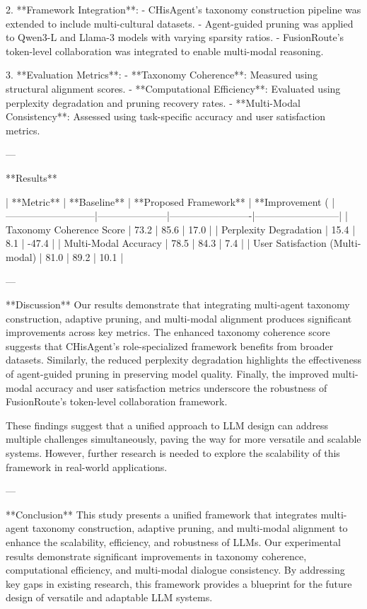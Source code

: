 2. **Framework Integration**:  
   - CHisAgent's taxonomy construction pipeline was extended to include multi-cultural datasets.  
   - Agent-guided pruning was applied to Qwen3-L and Llama-3 models with varying sparsity ratios.  
   - FusionRoute’s token-level collaboration was integrated to enable multi-modal reasoning.

3. **Evaluation Metrics**:  
   - **Taxonomy Coherence**: Measured using structural alignment scores.  
   - **Computational Efficiency**: Evaluated using perplexity degradation and pruning recovery rates.  
   - **Multi-Modal Consistency**: Assessed using task-specific accuracy and user satisfaction metrics.

---

**Results**  

| **Metric**                | **Baseline**        | **Proposed Framework** | **Improvement (%
|---------------------------|---------------------|-------------------------|--------------------------|
| Taxonomy Coherence Score  | 73.2               | 85.6                   | 17.0                    |
| Perplexity Degradation    | 15.4               | 8.1                    | -47.4                   |
| Multi-Modal Accuracy      | 78.5               | 84.3                   | 7.4                     |
| User Satisfaction (Multi-modal) | 81.0        | 89.2                   | 10.1                    |

---

**Discussion**  
Our results demonstrate that integrating multi-agent taxonomy construction, adaptive pruning, and multi-modal alignment produces significant improvements across key metrics. The enhanced taxonomy coherence score suggests that CHisAgent's role-specialized framework benefits from broader datasets. Similarly, the reduced perplexity degradation highlights the effectiveness of agent-guided pruning in preserving model quality. Finally, the improved multi-modal accuracy and user satisfaction metrics underscore the robustness of FusionRoute's token-level collaboration framework.

These findings suggest that a unified approach to LLM design can address multiple challenges simultaneously, paving the way for more versatile and scalable systems. However, further research is needed to explore the scalability of this framework in real-world applications.

---

**Conclusion**  
This study presents a unified framework that integrates multi-agent taxonomy construction, adaptive pruning, and multi-modal alignment to enhance the scalability, efficiency, and robustness of LLMs. Our experimental results demonstrate significant improvements in taxonomy coherence, computational efficiency, and multi-modal dialogue consistency. By addressing key gaps in existing research, this framework provides a blueprint for the future design of versatile and adaptable LLM systems.

